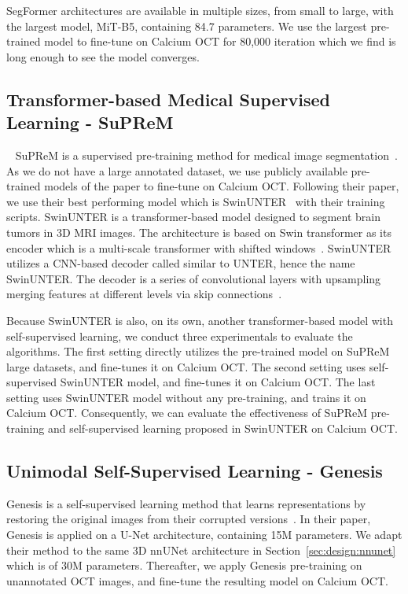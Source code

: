 \documentclass[a4paper,11pt,oneside]{report}
\begin{document}
SegFormer architectures are available in multiple sizes, from small to large, with the largest model, MiT-B5, containing 84.7 parameters. We use the largest pre-trained model to fine-tune on Calcium OCT for 80,000 iteration which we find is long enough to see the model converges.

\subsection{Transformer-based Medical Supervised Learning - SuPReM}~\label{sec:design:suprem}
SuPReM is a supervised pre-training method for medical image segmentation~\cite{Li2024}. As we do not have a large annotated dataset, we use publicly available pre-trained models of the paper to fine-tune on Calcium OCT. Following their paper, we use their best performing model which is SwinUNTER~\cite{Tang2022} with their training scripts. SwinUNTER is a transformer-based model designed to segment brain tumors in 3D MRI images. The architecture is based on Swin transformer as its encoder which is a multi-scale transformer with shifted windows~\cite{Liu2021Swin}. SwinUNTER utilizes a CNN-based decoder called similar to UNTER, hence the name SwinUNTER. The decoder is a series of convolutional layers with upsampling merging features at different levels via skip connections~\cite{Hatamizadeh2022}.

Because SwinUNTER is also, on its own, another transformer-based model with self-supervised learning, we conduct three experimentals to evaluate the algorithms. The first setting directly utilizes the pre-trained model on SuPReM large datasets, and fine-tunes it on Calcium OCT. The second setting uses self-supervised SwinUNTER model, and fine-tunes it on Calcium OCT. The last setting uses SwinUNTER model without any pre-training, and trains it on Calcium OCT. Consequently, we can evaluate the effectiveness of SuPReM pre-training and self-supervised learning proposed in SwinUNTER on Calcium OCT.


\subsection{Unimodal Self-Supervised Learning - Genesis}
Genesis is a self-supervised learning method that learns representations by restoring the original images from their corrupted versions~\cite{Zhou2021}. In their paper, Genesis is applied on a U-Net architecture, containing 15M parameters. We adapt their method to the same 3D nnUNet architecture in Section~\ref{sec:design:nnunet} which is of 30M parameters. Thereafter, we apply Genesis pre-training on unannotated OCT images, and fine-tune the resulting model on Calcium OCT.
\end{document}
